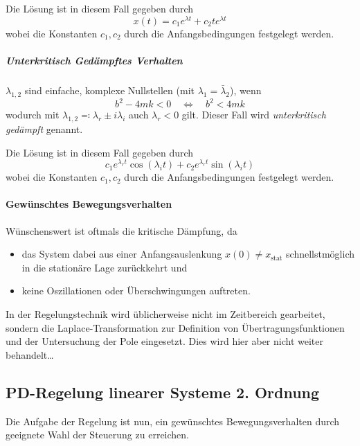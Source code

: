 					Die Lösung ist in diesem Fall gegeben durch
					\begin{equation*}
						x(t) = c_1 e^{\lambda t} + c_2 t e^{\lambda t}
					\end{equation*}
					wobei die Konstanten \( c_1, c_2 \) durch die Anfangsbedingungen festgelegt werden.

				\subparagraph{Unterkritisch Gedämpftes Verhalten}
					\( \lambda_{1, 2} \) sind einfache, komplexe Nullstellen (mit \( \lambda_1 = \bar{\lambda}_2 \)), wenn
					\begin{equation*}
						b^2 - 4mk < 0 \quad\iff\quad b^2 < 4mk
					\end{equation*}
					wodurch mit \( \lambda_{1, 2} \eqqcolon \lambda_r \pm i \lambda_i \) auch \( \lambda_r < 0 \) gilt. Dieser Fall wird \emph{unterkritisch gedämpft} genannt.

					Die Lösung ist in diesem Fall gegeben durch
					\begin{equation*}
						c_1 e^{\lambda_r t} \cos(\lambda_i t) + c_2 e^{\lambda_r t} \sin(\lambda_i t)
					\end{equation*}
					wobei die Konstanten \( c_1, c_2 \) durch die Anfangsbedingungen festgelegt werden.

			\paragraph{Gewünschtes Bewegungsverhalten}
				Wünschenswert ist oftmals die kritische Dämpfung, da
				\begin{itemize}
					\item das System dabei aus einer Anfangsauslenkung \( x(0) \neq x_\text{stat} \) schnellstmöglich in die stationäre Lage zurückkehrt und
					\item keine Oszillationen oder Überschwingungen auftreten.
				\end{itemize}

				In der Regelungstechnik wird üblicherweise nicht im Zeitbereich gearbeitet, sondern die Laplace-Transformation zur Definition von Übertragungsfunktionen und der Untersuchung der Pole eingesetzt. Dies wird hier aber nicht weiter behandelt\dots

	\subsection{PD-Regelung linearer Systeme 2. Ordnung} %
		Die Aufgabe der Regelung ist nun, ein gewünschtes Bewegungsverhalten durch geeignete Wahl der Steuerung zu erreichen.

